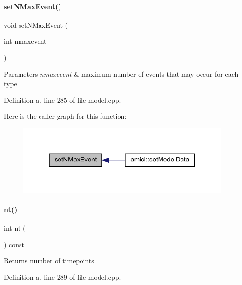 \paragraph{\texorpdfstring{set\+N\+Max\+Event()}{setNMaxEvent()}}
{\footnotesize\ttfamily void set\+N\+Max\+Event (\begin{DoxyParamCaption}\item[{int}]{nmaxevent }\end{DoxyParamCaption})}


\begin{DoxyParams}{Parameters}
{\em nmaxevent} & maximum number of events that may occur for each type \\
\hline
\end{DoxyParams}


Definition at line 285 of file model.\+cpp.

Here is the caller graph for this function\+:
\nopagebreak
\begin{figure}[H]
\begin{center}
\leavevmode
\includegraphics[width=304pt]{classamici_1_1_model_a35f06fdd341805405b851788ffe981c4_icgraph}
\end{center}
\end{figure}
\mbox{\label{classamici_1_1_model_a4c23d300cbe15b0afb1ee3731d47cc93}} 
\paragraph{\texorpdfstring{nt()}{nt()}}
{\footnotesize\ttfamily int nt (\begin{DoxyParamCaption}{ }\end{DoxyParamCaption}) const}

\begin{DoxyReturn}{Returns}
number of timepoints 
\end{DoxyReturn}


Definition at line 289 of file model.\+cpp.

